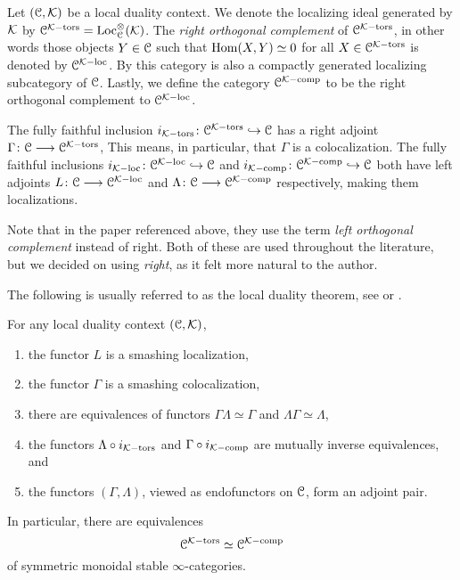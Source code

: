 \begin{construction}
    Let $(\EuScript{C}, \mathcal{K})$ be a local duality context. We denote the localizing ideal generated by $\mathcal{K}$ by $\EuScript{C}^{\mathcal{K}-\mathrm{tors}} = \operatorname{Loc}_{\EuScript{C}}^\otimes(\mathcal{K})$. The \emph{right orthogonal complement} of $\EuScript{C}^{\mathcal{K}-\mathrm{tors}}$, in other words those objects $Y\in \EuScript{C}$ such that $\operatorname{Hom}(X, Y) \simeq 0$ for all $X\in \EuScript{C}^{\mathcal{K}-\mathrm{tors}}$ is denoted by $\EuScript{C}^{\mathcal{K}-\mathrm{loc}}$. By \cite[2.17]{barthel-heard-valenzuela_2018} this category is also a compactly generated localizing subcategory of $\EuScript{C}$. Lastly, we define the category $\EuScript{C}^{\mathcal{K}-\mathrm{comp}}$ to be the right orthogonal complement to $\EuScript{C}^{\mathcal{K}-\mathrm{loc}}$. 

    The fully faithful inclusion $i_{\mathcal{K}-\mathrm{tors}}\colon\EuScript{C}^{\mathcal{K}-\mathrm{tors}}\hookrightarrow \EuScript{C}$ has a right adjoint $\Gamma \colon\EuScript{C}\longrightarrow \EuScript{C}^{\mathcal{K}-\mathrm{tors}}$, This means, in particular, that $\Gamma$ is a colocalization. The fully faithful inclusions $i_{\mathcal{K}-\mathrm{loc}}\colon\EuScript{C}^{\mathcal{K}-\mathrm{loc}}\hookrightarrow \EuScript{C}$ and $i_{\mathcal{K}-\mathrm{comp}}\colon\EuScript{C}^{\mathcal{K}-\mathrm{comp}}\hookrightarrow \EuScript{C}$ both have left adjoints $L\colon \EuScript{C}\longrightarrow \EuScript{C}^{\mathcal{K}-\mathrm{loc}}$ and $\Lambda\colon\EuScript{C}\longrightarrow \EuScript{C}^{\mathcal{K}-\mathrm{comp}}$ respectively, making them localizations. 
\end{construction}

\begin{remark}
    Note that in the paper \cite{barthel-heard-valenzuela_2018} referenced above, they use the term \emph{left orthogonal complement} instead of right. Both of these are used throughout the literature, but we decided on using \emph{right}, as it felt more natural to the author. 
\end{remark}

The following is usually referred to as the local duality theorem, see \cite[3.3.5]{hovey-palmiery-strickland_97} or \cite[2.21]{barthel-heard-valenzuela_2018}. 

\begin{theorem}
    \label{ch2:thm:local-duality-co-contra}
    For any local duality context $(\EuScript{C}, \mathcal{K})$, 
    \begin{enumerate}
        \item the functor $L$ is a smashing localization,
        \item the functor $\Gamma$ is a smashing colocalization, 
        \item there are equivalences of functors $\Gamma \Lambda \simeq \Gamma$ and $\Lambda\Gamma \simeq \Lambda$,  
        \item the functors $\Lambda\circ i_{\mathcal{K}-\mathrm{tors}}$ and $\Gamma \circ i_{\mathcal{K}-\mathrm{comp}}$ are mutually inverse equivalences, and 
        \item the functors $(\Gamma, \Lambda)$, viewed as endofunctors on $\EuScript{C}$, form an adjoint pair. 
    \end{enumerate} 
    In particular, there are equivalences
    \[\EuScript{C}^{\mathcal{K}-\mathrm{tors}}\simeq \EuScript{C}^{\mathcal{K}-\mathrm{comp}}\]
    of symmetric monoidal stable $\infty$-categories. 
\end{theorem}

